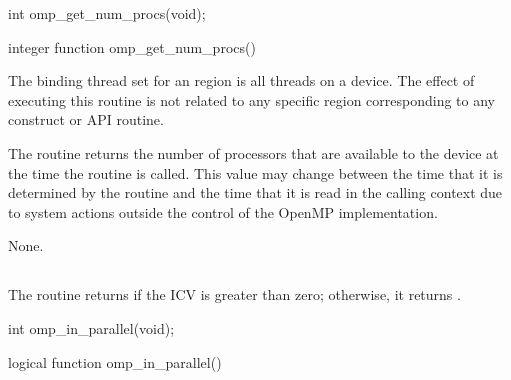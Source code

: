 \format
\begin{ccppspecific}
\begin{ompcFunction}
int omp_get_num_procs(void);
\end{ompcFunction}
\end{ccppspecific}

\begin{fortranspecific}
\begin{ompfFunction}
integer function omp_get_num_procs()
\end{ompfFunction}
\end{fortranspecific}

\binding
The binding thread set for an  region is all threads on a device.
The effect of executing this routine is not related to any specific region corresponding to
any construct or API routine.

\effect
The  routine returns the number of processors that are available
to the device at the time the routine is called. This value may change between
the time that it is determined by the  routine and the time that it
is read in the calling context due to system actions outside the control of the OpenMP
implementation.

\crossreferences
None.







\subsection{}
\label{subsec:omp_in_parallel}
\summary
The  routine returns  if the  ICV is greater
than zero; otherwise, it returns .

\format
\begin{ccppspecific}
\begin{ompcFunction}
int omp_in_parallel(void);
\end{ompcFunction}
\end{ccppspecific}

\begin{fortranspecific}
\begin{ompfFunction}
logical function omp_in_parallel()
\end{ompfFunction}
\end{fortranspecific}

